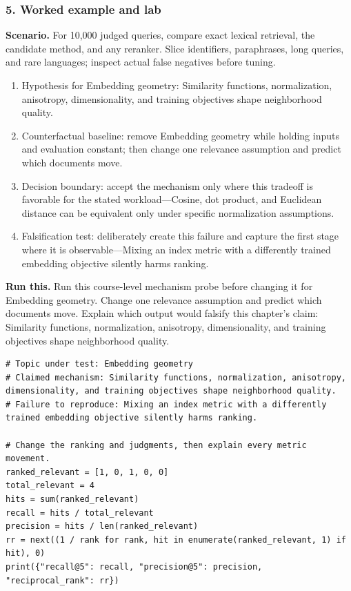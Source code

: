 \subsubsection*{5. Worked example and lab}
\textbf{Scenario.} For 10,000 judged queries, compare exact lexical retrieval, the candidate method, and any reranker. Slice identifiers, paraphrases, long queries, and rare languages; inspect actual false negatives before tuning.
\begin{enumerate}
\item Hypothesis for Embedding geometry: Similarity functions, normalization, anisotropy, dimensionality, and training objectives shape neighborhood quality.
\item Counterfactual baseline: remove Embedding geometry while holding inputs and evaluation constant; then change one relevance assumption and predict which documents move.
\item Decision boundary: accept the mechanism only where this tradeoff is favorable for the stated workload—Cosine, dot product, and Euclidean distance can be equivalent only under specific normalization assumptions.
\item Falsification test: deliberately create this failure and capture the first stage where it is observable—Mixing an index metric with a differently trained embedding objective silently harms ranking.
\end{enumerate}
\textbf{Run this.} Run this course-level mechanism probe before changing it for Embedding geometry. Change one relevance assumption and predict which documents move. Explain which output would falsify this chapter's claim: Similarity functions, normalization, anisotropy, dimensionality, and training objectives shape neighborhood quality.
\begin{Verbatim}[fontsize=\scriptsize]
# Topic under test: Embedding geometry
# Claimed mechanism: Similarity functions, normalization, anisotropy, dimensionality, and training objectives shape neighborhood quality.
# Failure to reproduce: Mixing an index metric with a differently trained embedding objective silently harms ranking.

# Change the ranking and judgments, then explain every metric movement.
ranked_relevant = [1, 0, 1, 0, 0]
total_relevant = 4
hits = sum(ranked_relevant)
recall = hits / total_relevant
precision = hits / len(ranked_relevant)
rr = next((1 / rank for rank, hit in enumerate(ranked_relevant, 1) if hit), 0)
print({"recall@5": recall, "precision@5": precision, "reciprocal_rank": rr})
\end{Verbatim}
